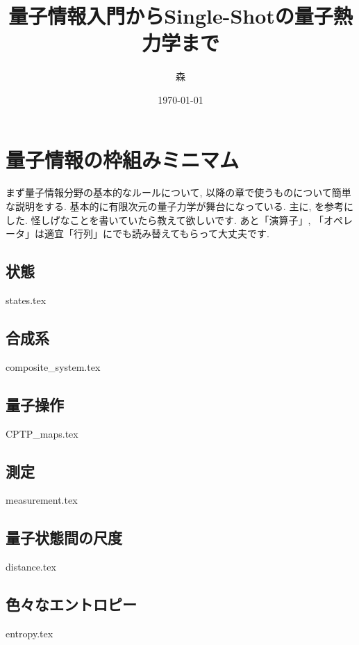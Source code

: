 \documentclass[report]{jlreq}
\title{量子情報入門からSingle-Shotの量子熱力学まで}
\author{森}
\date{\today}
\begin{document}
\maketitle

\setcounter{tocdepth}{1}
\thispagestyle{TOC}
\tableofcontents


\pagestyle{mystyle}
\chapter{量子情報の枠組みミニマム}\label{chap.quantum_info_basic}
まず量子情報分野の基本的なルールについて, 以降の章で使うものについて簡単な説明をする. 
基本的に有限次元の量子力学が舞台になっている. 
主に\cite{nielsen2010quantum}, \cite{SagawaEntropy}を参考にした. 
怪しげなことを書いていたら教えて欲しいです. 
あと「演算子」, 「オペレータ」は適宜「行列」にでも読み替えてもらって大丈夫です. 
\section{状態}
{states.tex}
\section{合成系}
{composite_system.tex}
\section{量子操作}
{CPTP_maps.tex}
\section{測定}
{measurement.tex}
\section{量子状態間の尺度}
{distance.tex}
\section{色々なエントロピー}
{entropy.tex}
\end{document}

